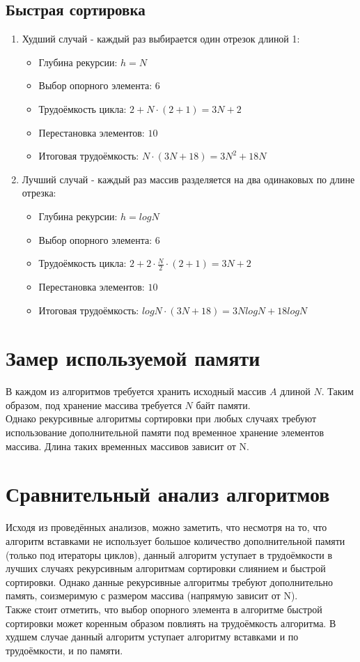 \documentclass[12pt, a4paper]{report}
\begin{document}
	\subsection{Быстрая сортировка}
		\begin{enumerate}
		\item Худший случай - каждый раз выбирается один отрезок длиной 1:
		\begin{itemize}
			\item Глубина рекурсии: $h = N$
			\item Выбор опорного элемента: $6$
			\item Трудоёмкость цикла: $2 + N\cdot(2 + 1)=3N + 2$
			\item Перестановка элементов: $10$\\
			\item Итоговая трудоёмкость: $N\cdot(3N + 18) = 3N^2 + 18N$
		\end{itemize}
		\item Лучший случай - каждый раз массив разделяется на два одинаковых по длине отрезка:
		\begin{itemize}
			\item Глубина рекурсии: $h = logN$
			\item Выбор опорного элемента: $6$
			\item Трудоёмкость цикла: $2 + 2\cdot\frac{N}{2}\cdot(2 + 1)=3N + 2$
			\item Перестановка элементов: $10$\\
			\item Итоговая трудоёмкость: $logN\cdot(3N + 18) = 3NlogN + 18logN$
		\end{itemize}
	\end{enumerate}

	\section{Замер используемой памяти}
	В каждом из алгоритмов требуется хранить исходный массив $A$ длиной $N$. Таким образом, под хранение массива требуется $N$ байт памяти.\\
	Однако рекурсивные алгоритмы сортировки при любых случаях требуют использование дополнительной памяти под временное хранение элементов массива. Длина таких временных массивов зависит от N.
	
	\section{Сравнительный анализ алгоритмов}
	Исходя из проведённых анализов, можно заметить, что несмотря на то, что алгоритм вставками не использует большое количество дополнительной памяти (только под итераторы циклов), данный алгоритм уступает в трудоёмкости в лучших случаях рекурсивным алгоритмам сортировки слиянием и быстрой сортировки. Однако данные рекурсивные алгоритмы требуют дополнительно память, соизмеримую с размером массива (напрямую зависит от N).\\
	Также стоит отметить, что выбор опорного элемента в алгоритме быстрой сортировки может коренным образом повлиять на трудоёмкость алгоритма. В худшем случае данный алгоритм уступает алгоритму вставками и по трудоёмкости, и по памяти.
	
\end{document}
